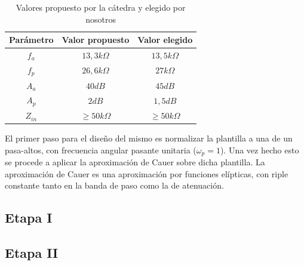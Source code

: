 \begin{table}[h]
\begin{tabular}{@{}|c|c|c|@{}}
\toprule
\textbf{Parámetro} & \textbf{Valor propuesto} & \textbf{Valor elegido} \\ \midrule
$f_a$              & $13,3k\Omega$              & $13,5k\Omega$            \\
$f_p$              & $26,6k\Omega$              & $27k\Omega$              \\
$A_a$              & $40dB$                     & $45dB$      			   \\
$A_p$              & $2dB$                      & $1,5dB$				   \\
$Z_{in}$           & $\geq50k\Omega$            & $\geq50k\Omega$           
\end{tabular}
\centering
\caption{Valores propuesto por la cátedra y elegido por nosotros}
\label{tabla componentes}
\end{table}

El primer paso para el diseño del mismo es normalizar la plantilla a una de un pasa-altos, con frecuencia angular pasante unitaria ($\omega_p =1$). Una vez hecho esto se procede a aplicar la aproximación de Cauer sobre dicha plantilla.
La aproximación de Cauer es una aproximación por funciones elípticas, con riple constante tanto en la banda de paso como la de atenuación. 



\subsection{Etapa I}

\subsection{Etapa II}

